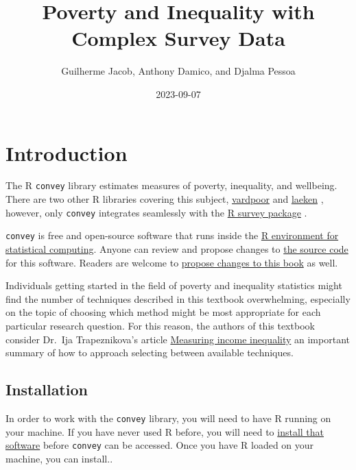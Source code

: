 \documentclass[
]{book}
\title{Poverty and Inequality with Complex Survey Data}
\author{Guilherme Jacob, Anthony Damico, and Djalma Pessoa}
\date{2023-09-07}
\begin{document}
\maketitle

{
\setcounter{tocdepth}{1}
\tableofcontents
}
\hypertarget{introduction}{%
\chapter{Introduction}\label{introduction}}

The R \texttt{convey} library estimates measures of poverty, inequality, and wellbeing. There are two other R libraries covering this subject, \href{https://CRAN.R-project.org/package=vardpoor}{vardpoor} \autocite{R-vardpoor} and \href{https://CRAN.R-project.org/package=laeken}{laeken} \autocite{R-laeken}, however, only \texttt{convey} integrates seamlessly with the \href{https://CRAN.R-project.org/package=survey}{R survey package} \autocite{R-survey-article,R-survey-book,R-survey}.

\texttt{convey} is free and open-source software that runs inside the \href{https://www.r-project.org/}{R environment for statistical computing}. Anyone can review and propose changes to \href{https://github.com/ajdamico/convey}{the source code} for this software. Readers are welcome to \href{https://github.com/guilhermejacob/context/}{propose changes to this book} as well.

Individuals getting started in the field of poverty and inequality statistics might find the number of techniques described in this textbook overwhelming, especially on the topic of choosing which method might be most appropriate for each particular research question. For this reason, the authors of this textbook consider Dr.~Ija Trapeznikova's article \href{https://wol.iza.org/articles/measuring-income-inequality/long}{Measuring income inequality} an important summary of how to approach selecting between available techniques.

\hypertarget{install}{%
\section{Installation}\label{install}}

In order to work with the \texttt{convey} library, you will need to have R running on your machine. If you have never used R before, you will need to \href{https://www.r-project.org/}{install that software} before \texttt{convey} can be accessed. Once you have R loaded on your machine, you can install..
\end{document}
